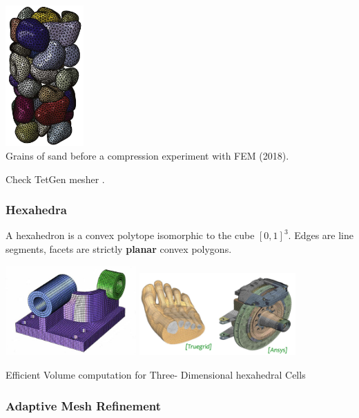 \begin{center}
\includegraphics[width=3cm]{images/meshes/imal18}\\
{\captionfont Grains of sand before a compression experiment with FEM \textcite{imal18} (2018).}
\end{center}


Check TetGen mesher . 

\subsubsection{Hexahedra}

A hexahedron is a convex polytope isomorphic to the cube $[0,1]^3$.
Edges are line segments, facets are strictly {\bf planar} convex polygons.

\begin{center}
\includegraphics[width=5cm]{images/meshes/hexa.jpg}
\includegraphics[width=6cm]{images/meshes/hexa2}
\end{center}

\Literature Efficient Volume computation for Three- Dimensional hexahedral Cells \cite{duko88,gran97}

\subsubsection{Adaptive Mesh Refinement}
 

